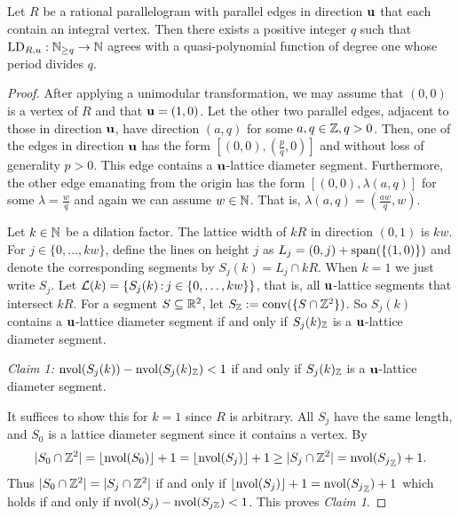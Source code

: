 \begin{proposition}\label{prop:QP-in-parallelotope}
    Let $R$ be a rational parallelogram with parallel edges in direction $\mathbf{u}$ that each contain an integral vertex. Then there exists a positive integer $q$ such that \mbox{$\operatorname{LD}_{R,u}:\mathbb{N}_{\geq q} \to \mathbb{N}$} agrees with a quasi-polynomial function of degree one whose period divides $q$.
\end{proposition}
\begin{proof}
    After applying a unimodular transformation, we may assume that $(0,0)$ is a vertex of $R$ and that $\mathbf{u} = (1,0)$. Let the other two parallel edges, adjacent to those in direction $\mathbf{u}$, have direction $(a,q)$ for some $a,q \in \mathbb{Z}, q >0$. Then, one of the edges in direction $\mathbf{u}$ has the form $[(0,0),(\frac{p}{q},0)]$ and without loss of generality $p>0$. This edge contains a $\mathbf{u}$-lattice diameter segment. Furthermore, the other edge emanating from the origin has the form $[(0,0),\lambda(a,q)]$ for some $\lambda = \frac{w}{q}$ and again we can assume $w \in \mathbb{N}$. That is, $\lambda(a,q) = (\frac{aw}{q},w)$.
    
    Let $k \in \mathbb{N}$ be a dilation factor. The lattice width of $kR$ in direction $(0,1)$ is $kw$.
    For $j \in \{0, \ldots, kw\}$, define the lines on height $j$ as $L_j = (0,j) + \operatorname{span}(\{(1,0)\})$ and denote the corresponding segments by $S_j(k) = L_j \cap kR$. When $k=1$ we just write $S_j$. Let $\mathcal{L}(k) = \{S_j(k) \, \mathrm{:}\, j \in \{0, \ldots, kw\}\}$, that is, all $\mathbf{u}$-lattice segments that intersect $kR$. For a segment $S \subseteq \mathbb{R}^2$, let $S_{{\mathbb{Z}}} := \operatorname{conv} (\{S \cap \mathbb{Z}^2\})$. So $S_j(k)$ contains a $\mathbf{u}$-lattice diameter segment if and only if $S_j(k)_{\mathbb{Z}}$ is a $\mathbf{u}$-lattice diameter segment.

    \emph{Claim 1:} $\operatorname{nvol}(S_j(k))-\operatorname{nvol}(S_{j}(k)_{\mathbb{Z}}) <1$ if and only if $S_{j}(k)_{\mathbb{Z}}$ is a $\mathbf{u}$-lattice diameter segment.
    
    It suffices to show this for $k=1$ since $R$ is arbitrary. All $S_j$ have the same length, and $S_0$ is a lattice diameter segment since it contains a vertex. By 
    \begin{align*}
        |S_0 \cap \mathbb{Z}^2| = \lfloor \operatorname{nvol}(S_0) \rfloor +1 
        = \lfloor \operatorname{nvol}(S_j) \rfloor +1  \geq |S_j \cap \mathbb{Z}^2| = \operatorname{nvol}({S_{j}}_{\mathbb{Z}}) +1.
    \end{align*}
    Thus $|S_0 \cap \mathbb{Z}^2| = |S_j \cap \mathbb{Z}^2|$ if and only if $\lfloor \operatorname{nvol}(S_j) \rfloor +1  = \operatorname{nvol}({S_{j}}_{\mathbb{Z}}) +1$ which holds if and only if $\operatorname{nvol}(S_j)- \operatorname{nvol}(S_{j{\mathbb{Z}}}) < 1$. This proves \textit{Claim 1}.



\end{proof}

